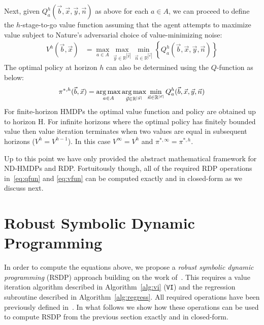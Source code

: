 \documentclass[letterpaper]{article}
\def\argmax{\operatornamewithlimits{arg\,max}}
\begin{document}
Next, given $Q_a^h(\vec{b},\vec{x},\vec{y},\vec{n})$ as above for each
$a \in A$, we can proceed to define the $h$-stage-to-go value function
assuming that the agent attempts to maximize value subject to Nature's
adversarial choice of value-minimizing noise:
\vspace{-2mm}
{\footnotesize
\begin{align}
V^{h}(\vec{b},\vec{x}) & = \max_{a \in A} \max_{\vec{y} \in \mathbb{R}^{|\vec{y}|}} \min_{\vec{n} \in \mathbb{R}^{|\vec{e}|}} \left\{ Q^{h}_a(\vec{b},\vec{x},\vec{y},\vec{n}) \right\} \label{eq:vfun}
\end{align}}
The optimal policy at horizon $h$ can also be determined using the
$Q$-function as below:
{\footnotesize
\begin{align}
\pi^{*,h}(\vec{b},\vec{x}) = \argmax_{a \in A}  \argmax_{\vec{y} \in \mathbb{R}^{|\vec{y}|}}  \min_{\vec{n} \in \mathbb{R}^{|\vec{e}|}}  Q^h_a(\vec{b},\vec{x},\vec{y},\vec{n})
\end{align}}
For finite-horizon HMDPs the optimal value function and policy are
obtained up to horizon H.  For infinite horizons where the optimal policy
has finitely bounded value then value iteration terminates when two
values are equal in subsequent horizons ($V^{h} = V^{h-1}$). In this
case $V^\infty = V^h$ and $\pi^{*,\infty} = \pi^{*,h}$.
 
Up to this point we have only provided the abstract mathematical
framework for ND-HMDPs and RDP.  Fortuitously though, all of the
required RDP operations in~\eqref{eq:qfun} and \eqref{eq:vfun} can be
computed exactly and in closed-form as we discuss next.

\section{Robust Symbolic Dynamic Programming} 

In order to compute the equations above, we propose a \emph{robust
symbolic dynamic programming} (RSDP) approach building on the work
of~\cite{sdp_aaai,sanner_uai11}.  This requires a value iteration
algorithm described in Algorithm~\ref{alg:vi} (\texttt{VI}) and the
regression subroutine described in Algorithm~\ref{alg:regress}.  All
required operations have been previously defined
in~\cite{sdp_aaai,sanner_uai11}.  In what follows we show how these
operations can be used to compute RSDP from the previous section
exactly and in closed-form.
\end{document}
